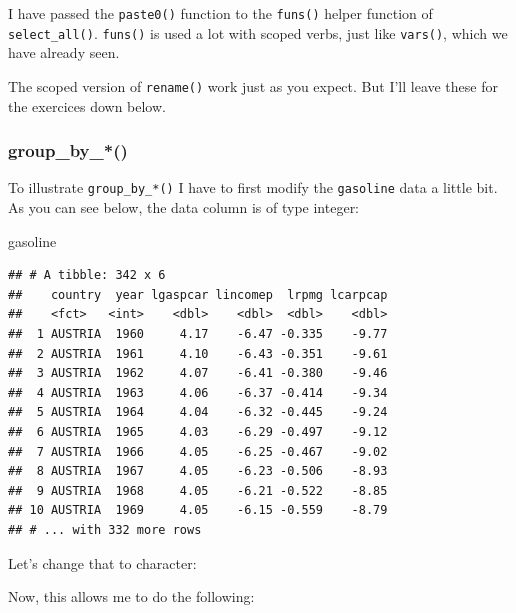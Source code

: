 \documentclass[]{gitbook}
\newenvironment{Shaded}{\begin{snugshade}}{\end{snugshade}}
\newcommand{\DataTypeTok}[1]{\textcolor[rgb]{0.13,0.29,0.53}{#1}}
\newcommand{\KeywordTok}[1]{\textcolor[rgb]{0.13,0.29,0.53}{\textbf{#1}}}
\newcommand{\NormalTok}[1]{#1}
\newcommand{\OperatorTok}[1]{\textcolor[rgb]{0.81,0.36,0.00}{\textbf{#1}}}
\newcommand{\StringTok}[1]{\textcolor[rgb]{0.31,0.60,0.02}{#1}}
\begin{document}
I have passed the \texttt{paste0()} function to the \texttt{funs()} helper function of \texttt{select\_all()}. \texttt{funs()} is
used a lot with scoped verbs, just like \texttt{vars()}, which we have already seen.

The scoped version of \texttt{rename()} work just as you expect. But I'll leave these for the exercices
down below.

\hypertarget{group_by_}{%
\subsubsection{group\_by\_*()}\label{group_by_}}

To illustrate \texttt{group\_by\_*()} I have to first modify the \texttt{gasoline} data a little bit. As you can
see below, the data column is of type integer:

\begin{Shaded}
\begin{Highlighting}[]
\NormalTok{gasoline}
\end{Highlighting}
\end{Shaded}

\begin{verbatim}
## # A tibble: 342 x 6
##    country  year lgaspcar lincomep  lrpmg lcarpcap
##    <fct>   <int>    <dbl>    <dbl>  <dbl>    <dbl>
##  1 AUSTRIA  1960     4.17    -6.47 -0.335    -9.77
##  2 AUSTRIA  1961     4.10    -6.43 -0.351    -9.61
##  3 AUSTRIA  1962     4.07    -6.41 -0.380    -9.46
##  4 AUSTRIA  1963     4.06    -6.37 -0.414    -9.34
##  5 AUSTRIA  1964     4.04    -6.32 -0.445    -9.24
##  6 AUSTRIA  1965     4.03    -6.29 -0.497    -9.12
##  7 AUSTRIA  1966     4.05    -6.25 -0.467    -9.02
##  8 AUSTRIA  1967     4.05    -6.23 -0.506    -8.93
##  9 AUSTRIA  1968     4.05    -6.21 -0.522    -8.85
## 10 AUSTRIA  1969     4.05    -6.15 -0.559    -8.79
## # ... with 332 more rows
\end{verbatim}

Let's change that to character:

\begin{Shaded}
\end{Shaded}

Now, this allows me to do the following:
\end{document}
